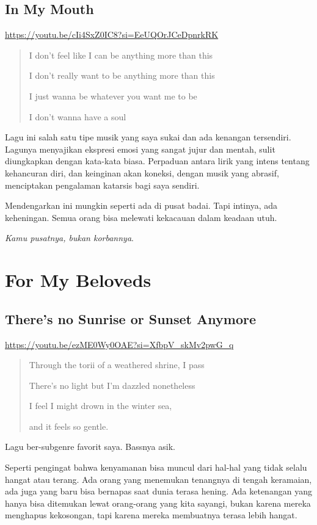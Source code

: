 \documentclass[
  letterpaper,
  DIV=11,
  numbers=noendperiod]{scrreprt}
\begin{document}
\subsection{In My Mouth}\label{in-my-mouth}

\url{https://youtu.be/cIi4SxZ0IC8?si=EeUQOrJCeDpnrkRK}

\begin{quote}
I don't feel like I can be anything more than this

I don't really want to be anything more than this

I just wanna be whatever you want me to be

I don't wanna have a soul
\end{quote}

Lagu ini salah satu tipe musik yang saya sukai dan ada kenangan
tersendiri. Lagunya menyajikan ekspresi emosi yang sangat jujur dan
mentah, sulit diungkapkan dengan kata-kata biasa. Perpaduan antara lirik
yang intens tentang kehancuran diri, dan keinginan akan koneksi, dengan
musik yang abrasif, menciptakan pengalaman katarsis bagi saya sendiri.

Mendengarkan ini mungkin seperti ada di pusat badai. Tapi intinya, ada
keheningan. Semua orang bisa melewati kekacauan dalam keadaan utuh.

\emph{Kamu pusatnya, bukan korbannya}.

\section{For My Beloveds}\label{for-my-beloveds}

\subsection{There's no Sunrise or Sunset
Anymore}\label{theres-no-sunrise-or-sunset-anymore}

\url{https://youtu.be/ezME0Wy0OAE?si=XfbpV_skMv2pwG_q}

\begin{quote}
Through the torii of a weathered shrine, I pass

There's no light but I'm dazzled nonetheless

I feel I might drown in the winter sea,

and it feels so gentle.
\end{quote}

Lagu ber-subgenre favorit saya. Bassnya asik.

Seperti pengingat bahwa kenyamanan bisa muncul dari hal-hal yang tidak
selalu hangat atau terang. Ada orang yang menemukan tenangnya di tengah
keramaian, ada juga yang baru bisa bernapas saat dunia terasa hening.
Ada ketenangan yang hanya bisa ditemukan lewat orang-orang yang kita
sayangi, bukan karena mereka menghapus kekosongan, tapi karena mereka
membuatnya terasa lebih hangat.
\end{document}
